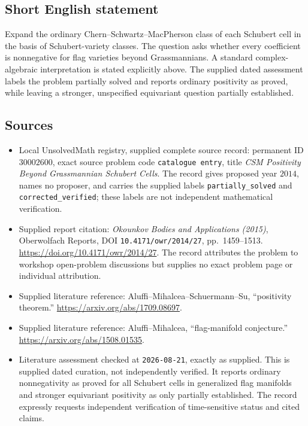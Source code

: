 \documentclass[11pt]{article}
\begin{document}
\subsection{Short English statement}
Expand the ordinary Chern--Schwartz--MacPherson class of each Schubert cell in the basis of Schubert-variety classes. The question asks whether every coefficient is nonnegative for flag varieties beyond Grassmannians. A standard complex-algebraic interpretation is stated explicitly above. The supplied dated assessment labels the problem partially solved and reports ordinary positivity as proved, while leaving a stronger, unspecified equivariant question partially established.
\subsection{Sources}
\begin{itemize}
\item Local UnsolvedMath registry, supplied complete source record: permanent ID \(30002600\), exact source problem code \texttt{catalogue entry}, title \emph{CSM Positivity Beyond Grassmannian Schubert Cells}. The record gives proposed year \(2014\), names no proposer, and carries the supplied labels \texttt{partially\_solved} and \texttt{corrected\_verified}; these labels are not independent mathematical verification.
\item Supplied report citation: \emph{Okounkov Bodies and Applications (2015)}, Oberwolfach Reports, DOI \texttt{10.4171/owr/2014/27}, pp.\ 1459--1513. \url{https://doi.org/10.4171/owr/2014/27}. The record attributes the problem to workshop open-problem discussions but supplies no exact problem page or individual attribution.
\item Supplied literature reference: Aluffi--Mihalcea--Schuermann--Su, ``positivity theorem.'' \url{https://arxiv.org/abs/1709.08697}.
\item Supplied literature reference: Aluffi--Mihalcea, ``flag-manifold conjecture.'' \url{https://arxiv.org/abs/1508.01535}.
\item Literature assessment checked at \texttt{2026-08-21}, exactly as supplied. This is supplied dated curation, not independently verified. It reports ordinary nonnegativity as proved for all Schubert cells in generalized flag manifolds and stronger equivariant positivity as only partially established. The record expressly requests independent verification of time-sensitive status and cited claims.
\end{itemize}
\end{document}
